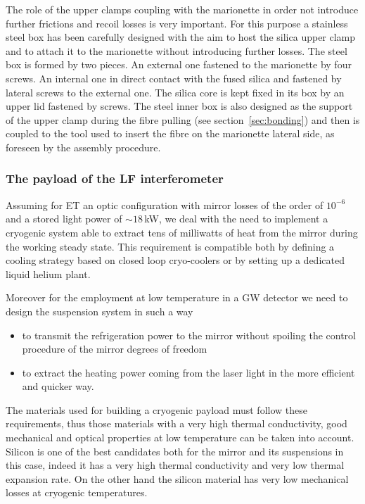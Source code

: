 The role of the upper clamps coupling with the marionette in order not introduce further frictions and recoil losses is very important. For this purpose a stainless steel box has been carefully designed with the aim to host the silica upper clamp and to attach it to the marionette without introducing further losses. The steel box is formed by two pieces. An external one fastened to the marionette by four screws. An internal one in direct contact with the fused silica and fastened by lateral screws to the external one. The silica core is kept fixed in its box by an upper lid fastened by screws. The steel inner box is also designed as the support of the upper clamp during the fibre pulling (see section~\ref{sec:bonding}) and then is coupled to the tool used to insert the fibre on the marionette lateral side, as foreseen by the assembly procedure.
 

\FloatBarrier
\subsubsection{The payload of the LF interferometer}
\label{sec:LF-interferometer}

Assuming for ET an optic configuration with mirror losses of  the order of $10^{-6}$ and a stored light power of $\sim 18$\,kW, we deal with the need to implement a cryogenic system able to extract  tens of  milliwatts of heat from the mirror during the working steady state. This requirement is compatible  both by defining a cooling strategy based on closed loop cryo-coolers or  by setting up a dedicated liquid helium plant.

Moreover for the employment at low temperature in a GW detector we need to design the suspension system in such a way
\begin{itemize}
\item{to transmit the refrigeration power to the mirror without spoiling the control procedure of the mirror degrees of freedom}
\item{to extract the heating power coming from the laser light in the more efficient and quicker way.}
\end{itemize}

The materials used for building a cryogenic payload must follow these requirements, thus those materials with a very high thermal conductivity, good mechanical and optical properties at low temperature can be taken into account.
Silicon is one of the best candidates both for the mirror and its suspensions in this case, indeed it has a very high thermal conductivity and very low thermal expansion rate. On the other hand the silicon material has very low mechanical losses at cryogenic temperatures.

